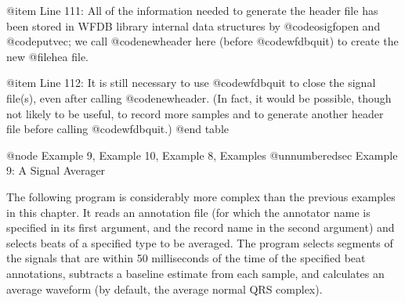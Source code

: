 {{{{{{{{{@item Line 111:
All of the information needed to generate the header file has been
stored in WFDB library internal data structures by @code{osigfopen} and 
@code{putvec};  we call @code{newheader} here (before @code{wfdbquit}) to
create the new @file{hea} file.

@item Line 112:
It is still necessary to use @code{wfdbquit} to close the signal file(s),
even after calling @code{newheader}.  (In fact, it would be possible,
though not likely to be useful, to record more samples and to generate
another header file before calling @code{wfdbquit}.)
@end table

@node     Example 9, Example 10, Example 8, Examples
@unnumberedsec Example 9: A Signal Averager

The following program is considerably more complex than the previous examples
in this chapter.  It reads an annotation file (for which the annotator name
is specified in its first argument, and the record name in the second
argument) and selects beats of a specified type to be averaged.  The
program selects segments of the signals that are within 50 milliseconds of the
time of the specified beat annotations, subtracts a baseline estimate
from each sample, and calculates an average waveform (by default, the
average normal QRS complex).

}}}}}}}}}
